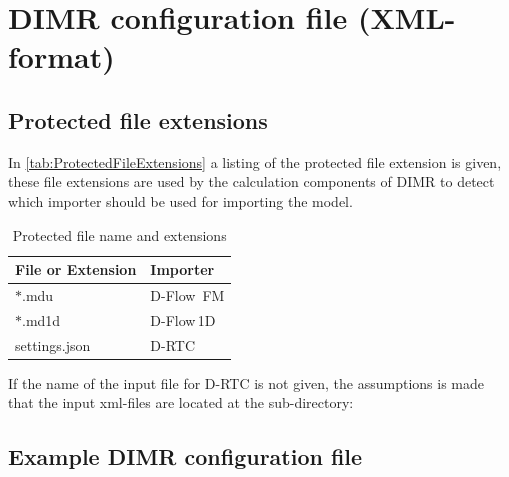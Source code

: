 \documentclass[signature]{deltares_manual}
\newcommand\T{\rule{0pt}{2.6ex}}       %
\newcommand\B{\rule[-1.2ex]{0pt}{0pt}} %
\newcommand{\dflowfm}{\textrm{D-Flow~FM}\xspace}
\newcommand{\dflowoned}{D-Flow\,1D\xspace}
\newcommand{\drtc}{D-RTC\xspace}
\newcommand{\dimr}{\textrm{DIMR}\xspace}
\begin{document}
\section{\dimr configuration file (XML-format)}
\label{sec:DIMR_config_XML}

\subsection{Protected file extensions}
In \autoref{tab:ProtectedFileExtensions} a listing of the protected file extension is given, these file extensions are used by the calculation components of \dimr to detect which importer should be used for importing the model.
\begin{longtable}{p{20mm}|p{20mm}}
	\caption{Protected file name and extensions\label{tab:ProtectedFileExtensions}}      
	\\  \hline
	\T \textbf{File or \newline Extension} & \textbf{Importer}  \B\\ \hline
	\T $\ast$.mdu & \dflowfm \\
	$\ast$.md1d & \dflowoned \\
	settings.json & \drtc \B \\
	\hline   
\end{longtable}

\begin{Remark}
	\item If the name of the input file for \drtc is not given, the assumptions is made that the input xml-files are located at the sub-directory: 
\end{Remark}

\subsection{Example \dimr configuration file}
\end{document}
